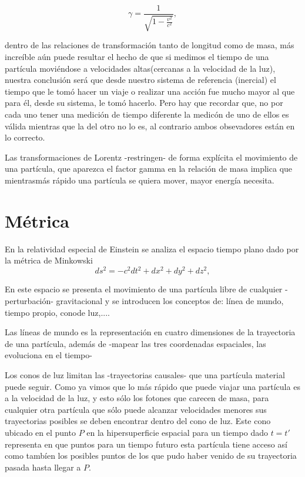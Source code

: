 \documentclass[11pt]{book}
\begin{document}
\begin{equation}
\gamma=\frac{1}{\sqrt{1-\frac{v^2}{c^2}}},
\label{fgamma}
\end{equation}



dentro de las relaciones de transformación tanto de longitud como de masa, más increíble aún puede resultar el hecho de que si medimos el tiempo de una partícula moviéndose a velocidades altas(cercanas a la velocidad de la luz), nuestra conclusión será que desde nuestro sistema de referencia (inercial) el tiempo que le tomó hacer un viaje o realizar una acción fue mucho mayor al que para él, desde su sistema, le tomó hacerlo.
Pero hay que recordar que, no por cada uno tener una medición  de tiempo diferente la medicón de uno de ellos es válida mientras que la del otro no lo es, al contrario ambos obsevadores están en lo correcto.

Las transformaciones de Lorentz -restringen- de forma explícita el movimiento de una partícula, que aparezca el factor gamma en la relación de masa implica que mientrasmás rápido una partícula se quiera mover, mayor energía necesita.

\section{Métrica}

En la relatividad especial de Einstein se analiza el espacio tiempo plano dado por la métrica de Minkowski
\begin{equation}
ds^2=-c^2dt^2+dx^2+dy^2+dz^2 ,
\label{minkowski}
\end{equation}


En este espacio se presenta el movimiento de una partícula libre de cualquier -perturbación- gravitacional y se introducen los conceptos de: línea de mundo, tiempo propio, conode luz,....

Las líneas de mundo es la representación en cuatro dimensiones de la trayectoria de una partícula, además de -mapear las tres coordenadas espaciales, las evoluciona en el tiempo-

Los conos de luz limitan las -trayectorias causales- que una partícula material puede seguir. Como ya vimos que lo más rápido que puede viajar una partícula es a la velocidad de la luz, y esto sólo los fotones que carecen de masa, para cualquier otra partícula que sólo puede alcanzar velocidades menores sus trayectorias posibles se deben encontrar dentro del cono de luz. Este cono ubicado en el punto $P$ en la hipersuperficie espacial para un tiempo dado $t=t'$ representa en que puntos para un tiempo futuro esta partícula tiene acceso así como tambíen los posibles puntos de los que pudo haber venido de su trayectoria pasada hasta llegar a $P$.
\end{document}
